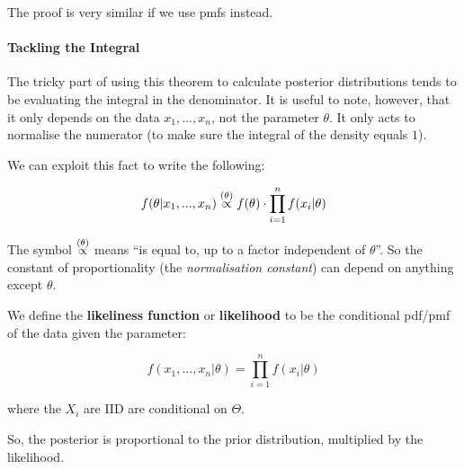 \documentclass[a4paper]{article}
\begin{document}
                    The proof is very similar if we use pmfs instead.

                \paragraph{Tackling the Integral}
                    The tricky part of using this theorem to calculate posterior
                    distributions tends to be evaluating the integral in the
                    denominator. It is useful to note, however, that it only
                    depends on the data $x_1, ..., x_n$, not the parameter
                    $\theta$. It only acts to normalise the numerator (to make
                    sure the integral of the density equals $1$).

                    We can exploit this fact to write the following:

                    \[
                        f(\theta | x_1, ..., x_n) \stackrel{({\theta})}{\propto}
                        f(\theta) \cdot \prod_{i=1}^n f(x_i | \theta)
                    \]

                    \begin{warn}
                        The symbol $\stackrel{({\theta})}{\propto}$ means ``is equal to, up to
                        a factor independent of $\theta$''. So the constant of
                        proportionality (the \textit{normalisation constant})
                        can depend on anything
                        except $\theta$.
                    \end{warn}

                    \begin{definition}
                        We define the \textbf{likeliness function} or
                        \textbf{likelihood} to be the conditional pdf/pmf of
                        the data given the parameter:

                        \[
                            f(x_1, ..., x_n | \theta) = \prod_{i=1}^n f(x_i |
                            \theta)
                        \]

                        where the $X_i$ are IID are conditional on $\Theta$.

                        So, the posterior is proportional to the prior
                        distribution, multiplied by the likelihood.
                    \end{definition}
\end{document}
